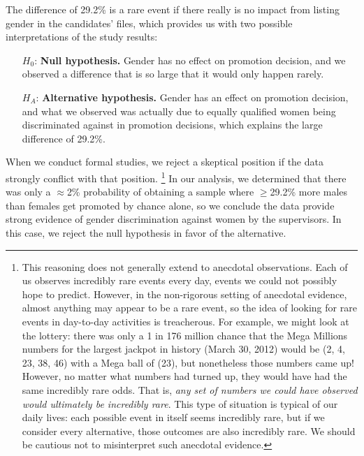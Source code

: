 The difference of 29.2\% is a rare event if there really is no impact from listing gender in the candidates' files, which provides us with two possible interpretations of the study results:
\begin{itemize}
\setlength{\itemsep}{0mm}
\item[$H_0$:] \textbf{Null hypothesis.} Gender has no effect on promotion decision, and we observed a difference that is so large that it would only happen rarely.
\item[$H_A$:] \textbf{Alternative hypothesis.} Gender has an effect on promotion decision, and what we observed was actually due to equally qualified women being discriminated against in promotion decisions, which explains the large difference of 29.2\%.
\end{itemize}
When we conduct formal studies, we reject a skeptical position if the data strongly conflict with that position.%
\footnote{This reasoning does not generally extend to anecdotal observations. Each of us observes incredibly rare events every day, events we could not possibly hope to predict. However, in the non-rigorous setting of anecdotal evidence, almost anything may appear to be a rare event, so the idea of looking for rare events in day-to-day activities is treacherous. For example, we might look at the lottery: there was only a 1 in 176 million chance that the Mega Millions numbers for the largest jackpot in history (March 30, 2012) would be (2, 4, 23, 38, 46) with a Mega ball of (23), but nonetheless those numbers came up! However, no matter what numbers had turned up, they would have had the same incredibly rare odds. That is, \emph{any set of numbers we could have observed would ultimately be incredibly rare}. This type of situation is typical of our daily lives: each possible event in itself seems incredibly rare, but if we consider every alternative, those outcomes are also incredibly rare. We should be cautious not to misinterpret such anecdotal evidence.} 
In our analysis, we determined that there was only a $\approx$2\% probability of obtaining a sample where $\geq$29.2\% more males than females get promoted by chance alone, so we conclude the data provide strong evidence of gender discrimination against women by the supervisors. In this case, we reject the null hypothesis in favor of the alternative.


